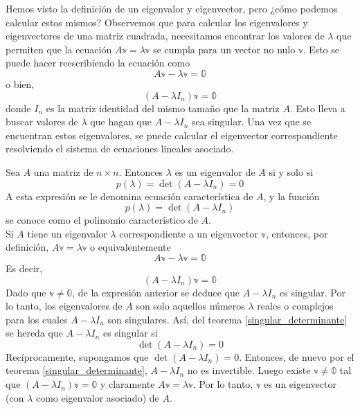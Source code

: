 Hemos visto la definición de un eigenvalor y eigenvector, pero ¿cómo podemos calcular estos mismos? Observemos que para calcular los eigenvalores y eigenvectores de una matriz cuadrada, necesitamos encontrar los valores de $\lambda$ que permiten que la ecuación $A \mathbb{v} = \lambda \mathbb{v}$ se cumpla para un vector no nulo $\mathbb{v}$. Esto se puede hacer reescribiendo la ecuación como
$$A \mathbb{v} - \lambda \mathbb{v} = \mathbb{0}$$
o bien,
$$(A - \lambda I_n) \mathbb{v} = \mathbb{0}$$
donde $I_n$ es la matriz identidad del mismo tamaño que la matriz $A$. Esto lleva a buscar valores de $\lambda$ que hagan que $A - \lambda I_n$ sea singular. Una vez que se encuentran estos eigenvalores, se puede calcular el eigenvector correspondiente resolviendo el sistema de ecuaciones lineales asociado.

\begin{theorem}
    Sea $A$ una matriz de $n \times n$. Entonces $\lambda$ es un eigenvalor de $A$ si y solo si
    $$p(\lambda) = \det(A - \lambda I_n) = 0$$
    A esta expresión se le denomina ecuación característica de $A$, y la función
    $$p(\lambda) = \det(A - \lambda I_n)$$
    se conoce como el polinomio característico de $A$. \\
    \demostracion Si $A$ tiene un eigenvalor $\lambda$ correspondiente a un eigenvector $\mathbb{v}$, entonces, por definición, $A \mathbb{v} = \lambda \mathbb{v}$ o equivalentemente
    $$A \mathbb{v} - \lambda \mathbb{v} = \mathbb{0}$$
    Es decir,
    $$(A - \lambda I_n) \mathbb{v} = \mathbb{0}$$
    Dado que $\mathbb{v} \neq \mathbb{0}$, de la expresión anterior se deduce que $A - \lambda I_n$ es singular. Por lo tanto, los eigenvalores de $A$ son solo aquellos números $\lambda$ reales o complejos para los cuales $A - \lambda I_n$ son singulares. Así, del teorema \ref{singular_determinante} se hereda que $A - \lambda I_n$ es singular si
    $$\det(A - \lambda I_n) = 0$$
    Recíprocamente, supongamos que $\det(A - \lambda I_n) = 0$. Entonces, de nuevo por el teorema \ref{singular_determinante}, $A - \lambda I_n$ no es invertible. Luego existe $\mathbb{v} \neq \mathbb{0}$ tal que $(A - \lambda I_n) \mathbb{v} = \mathbb{0}$ y claramente $A \mathbb{v} = \lambda \mathbb{v}$. Por lo tanto, $\mathbb{v}$ es un eigenvector (con $\lambda$ como eigenvalor asociado) de $A$.
\end{theorem}


